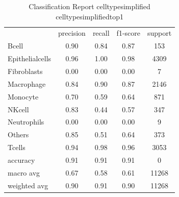 \begin{table}[htbp]
\centering
\caption{Classification Report celltypesimplified celltypesimplifiedtop1}
\label{tab:classificationreport.celltypesimplified.celltypesimplifiedtop1}
\begin{tabular}{lcccc}
 & precision & recall & f1-score & support \\
Bcell & 0.90 & 0.84 & 0.87 & 153 \\
Epithelialcells & 0.96 & 1.00 & 0.98 & 4309 \\
Fibroblasts & 0.00 & 0.00 & 0.00 & 7 \\
Macrophage & 0.84 & 0.90 & 0.87 & 2146 \\
Monocyte & 0.70 & 0.59 & 0.64 & 871 \\
NKcell & 0.83 & 0.44 & 0.57 & 347 \\
Neutrophils & 0.00 & 0.00 & 0.00 & 9 \\
Others & 0.85 & 0.51 & 0.64 & 373 \\
Tcells & 0.94 & 0.98 & 0.96 & 3053 \\
accuracy & 0.91 & 0.91 & 0.91 & 0 \\
macro avg & 0.67 & 0.58 & 0.61 & 11268 \\
weighted avg & 0.90 & 0.91 & 0.90 & 11268 \\
\end{tabular}
\end{table}
